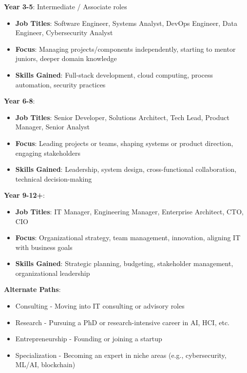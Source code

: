 \noindent\textbf{Year 3-5}: Intermediate / Associate roles

\begin{itemize}
    \item \textbf{Job Titles}: Software Engineer, Systems Analyst, DevOps Engineer, Data Engineer, Cybersecurity Analyst
    \item \textbf{Focus}: Managing projects/components independently, starting to mentor juniors, deeper domain knowledge
    \item \textbf{Skills Gained}: Full-stack development, cloud computing, process automation, security practices
\end{itemize}

\bigskip

\noindent\textbf{Year 6-8}:

\begin{itemize}
    \item \textbf{Job Titles}: Senior Developer, Solutions Architect, Tech Lead, Product Manager, Senior Analyst
    \item \textbf{Focus}: Leading projects or teams, shaping systems or product direction, engaging stakeholders
    \item \textbf{Skills Gained}: Leadership, system design, cross-functional collaboration, technical decision-making
\end{itemize}

\bigskip

\noindent\textbf{Year 9-12+}:

\begin{itemize}
    \item \textbf{Job Titles}: IT Manager, Engineering Manager, Enterprise Architect, CTO, CIO
    \item \textbf{Focus}: Organizational strategy, team management, innovation, aligning IT with business goals
    \item \textbf{Skills Gained}: Strategic planning, budgeting, stakeholder management, organizational leadership
\end{itemize}

\bigskip

\noindent\textbf{Alternate Paths}:

\begin{itemize}
    \item Consulting - Moving into IT consulting or advisory roles
    \item Research - Pursuing a PhD or research-intensive career in AI, HCI, etc.
    \item Entrepreneurship - Founding or joining a startup
    \item Specialization - Becoming an expert in niche areas (e.g., cybersecurity, ML/AI, blockchain)
\end{itemize}

